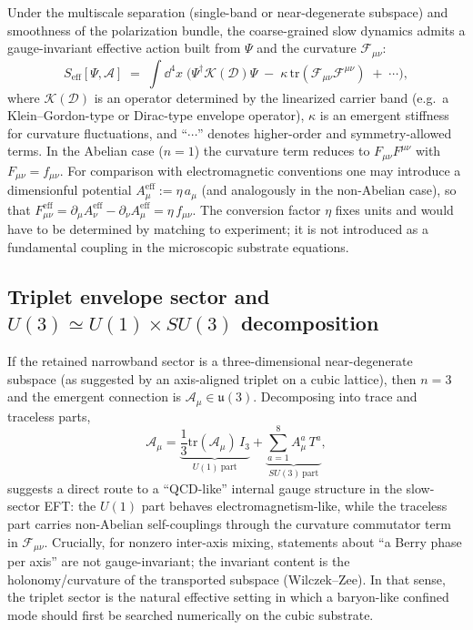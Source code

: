 Under the multiscale separation (single-band or near-degenerate subspace) and smoothness of the polarization bundle,
the coarse-grained slow dynamics admits a gauge-invariant effective action built from $\Psi$ and the curvature
$\mathcal{F}_{\mu\nu}$:
\begin{equation}
  S_{\text{eff}}[\Psi,\mathcal{A}]
  \;=\;\int \dd^4x\;
  \Big(
    \Psi^\dagger \mathcal{K}(\mathcal{D}) \Psi
    \;-\;\kappa\,\mathrm{tr}(\mathcal{F}_{\mu\nu}\mathcal{F}^{\mu\nu})
    \;+\;\cdots
  \Big),
  \label{eq:Seff}
\end{equation}
where $\mathcal{K}(\mathcal{D})$ is an operator determined by the linearized carrier band (e.g.\ a Klein--Gordon-type or
Dirac-type envelope operator), $\kappa$ is an emergent stiffness for curvature fluctuations, and ``$\cdots$'' denotes
higher-order and symmetry-allowed terms.
In the Abelian case ($n=1$) the curvature term reduces to $F_{\mu\nu}F^{\mu\nu}$ with $F_{\mu\nu}=f_{\mu\nu}$.
For comparison with electromagnetic conventions one may introduce a dimensionful potential
$A^{\mathrm{eff}}_\mu := \eta\,a_\mu$ (and analogously in the non-Abelian case),
so that $F^{\mathrm{eff}}_{\mu\nu}=\partial_\mu A^{\mathrm{eff}}_\nu-\partial_\nu A^{\mathrm{eff}}_\mu=\eta\,f_{\mu\nu}$.
The conversion factor $\eta$ fixes units and would have to be determined by matching to experiment; it is not introduced
as a fundamental coupling in the microscopic substrate equations.

\subsection{\texorpdfstring{Triplet envelope sector and $U(3)\simeq U(1)\times SU(3)$ decomposition}{Triplet envelope sector and U(3) ~= U(1) x SU(3) decomposition}}
\label{subsec:triplet-u3}

If the retained narrowband sector is a three-dimensional near-degenerate subspace (as suggested by an axis-aligned
triplet on a cubic lattice), then $n=3$ and the emergent connection is $\mathcal{A}_\mu\in\mathfrak{u}(3)$.
Decomposing into trace and traceless parts,
\begin{equation}
  \mathcal{A}_\mu
  = \underbrace{\frac{1}{3}\mathrm{tr}(\mathcal{A}_\mu)\,I_3}_{U(1)\ \text{part}}
  + \underbrace{\sum_{a=1}^{8}A^a_\mu\,T^a}_{SU(3)\ \text{part}},
\end{equation}
suggests a direct route to a ``QCD-like'' internal gauge structure in the slow-sector EFT:
the $U(1)$ part behaves electromagnetism-like, while the traceless part carries non-Abelian self-couplings through
the curvature commutator term in $\mathcal{F}_{\mu\nu}$.
Crucially, for nonzero inter-axis mixing, statements about ``a Berry phase per axis'' are not gauge-invariant; the
invariant content is the holonomy/curvature of the transported subspace (Wilczek--Zee).
In that sense, the triplet sector is the natural effective setting in which a baryon-like confined mode should first be
searched numerically on the cubic substrate.

